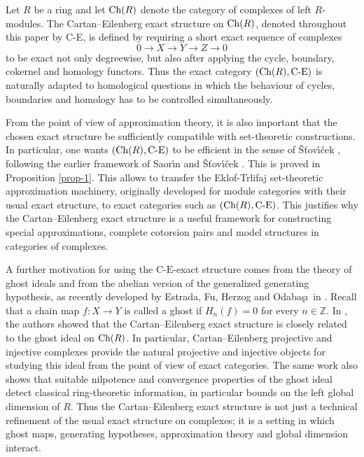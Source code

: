 \documentclass[reqno,12pt]{amsart}
\numberwithin{equation}{section}
\def\Ch{\mbox{\rm Ch}}
\theoremstyle{plain}
\theoremstyle{definition}
\newcommand{\CE}{\mathrm{C}\text{-}\mathrm{E}}
\begin{document}
Let $R$ be a ring and let $\Ch(R)$ denote the category of complexes of left
$R$-modules. The Cartan--Eilenberg exact structure on $\Ch(R)$, denoted
throughout this paper by C-E, is defined by requiring a short exact sequence of
complexes
$$
0 \longrightarrow X \longrightarrow Y \longrightarrow Z \longrightarrow 0
$$
to be exact not only degreewise, but also after applying the cycle, boundary,
cokernel and homology functors. Thus the exact category $(\Ch(R),\text{\rm C-E})$
is naturally adapted to homological questions in which the behaviour of cycles,
boundaries and homology has to be controlled simultaneously.

From the point of view of approximation theory, it is also important that the chosen exact structure be sufficiently compatible with set-theoretic constructions. In particular, one wants $(\Ch(R),\CE)$ to be efficient in the sense of \v{S}\v{t}ov\'{\i}\v{c}ek \cite{S13}, following the earlier framework of Saor\'{\i}n and \v{S}\v{t}ov\'{\i}\v{c}ek \cite{SS11}. This is proved in Proposition \ref{prop-1}. This allows to transfer the Eklof-Trlifaj set-theoretic approximation machinery, originally developed for module categories with their usual exact structure, to exact categories such as $(\Ch(R),\CE)$. This justifies why the Cartan--Eilenberg exact structure is a useful framework for constructing special approximations, complete cotorsion pairs and model structures in categories of complexes.

A further motivation for using the $\CE$-exact structure comes from the theory of
ghost ideals and from the abelian version of the generalized generating
hypothesis, as recently developed by Estrada, Fu, Herzog and Odaba\c s\i\ in \cite{EFHO26}. Recall that a chain map $f\colon X\to Y$ is called a ghost if $H_n(f)=0$
for every $n\in\mathbb Z$. In \cite[Section 8]{EFHO26}, the authors showed that the Cartan--Eilenberg exact structure is
closely related to the ghost ideal on $\Ch(R)$. In particular,
Cartan--Eilenberg projective and injective complexes provide the natural
projective and injective objects for studying this ideal from the point of view
of exact categories. The same work also shows that suitable nilpotence and convergence properties of the ghost ideal detect classical ring-theoretic information, in particular bounds on the left global dimension of $R$. Thus the Cartan--Eilenberg exact structure is not just a technical refinement of the usual exact structure on complexes; it is a setting in which ghost maps, generating hypotheses, approximation theory and global dimension interact.
\end{document}
